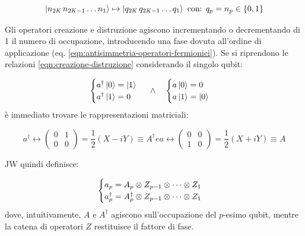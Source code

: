\begin{equation}
    \ket{n_{2\scalebox{0.7}{$K$}}\,n_{2\scalebox{0.7}{$K$}-1}\dots n_1} \mapsto
    \ket{q_{2\scalebox{0.7}{$K$}}\,q_{2\scalebox{0.7}{$K$}-1} \dots q_1}\ \text{con: }
    q_p = n_p \in \{0,1\}
\end{equation}

Gli operatori creazione e distruzione agiscono incrementando o decrementando di 1 il numero di occupazione, introducendo una fase dovuta all'ordine di applicazione (eq. \ref{eqn:antisimmetria-operatori-fermionici}). Se si riprendono le relazioni \ref{eqn:creazione-distruzione} considerando il singolo qubit:

\begin{equation}
\begin{cases}
    a^{\dagger}\ket{0} = \ket{1}\\
    a^{\dagger}\ket{1} = 0
\end{cases}
\ \land\ \ \ 
\begin{cases}
    a\ket{0} = 0\\
    a\ket{1} = \ket{0}
\end{cases}
\end{equation}
\newline
è immediato trovare le rappresentazioni matriciali:

\begin{subequations}
\begin{equation}
    a^{\dagger} \longleftrightarrow 
    \begin{pmatrix}
        0 &1\\
        0 &0
    \end{pmatrix}
    =  \frac12(X-iY) \equiv A^{\dagger}
\end{equation}

e

\begin{equation}
    a \longleftrightarrow 
    \begin{pmatrix}
        0 &0\\
        1 &0
    \end{pmatrix}
    =  \frac12(X+iY) \equiv A
\end{equation}
\end{subequations}

JW quindi definisce:

\begin{equation}\label{eqn:Jordan-Wigner-mapping}
\begin{cases}
    a_{p} = A_{p} \otimes Z_{p-1} \otimes \dots \otimes Z_{1}\\
    a^{\dagger}_{p} = A^{\dagger}_{p} \otimes Z_{p-1} \otimes \dots \otimes Z_{1} \vphantom{\int}
\end{cases}
\end{equation}
\newline
dove, intuitivamente, $A$ e $A^\dagger$ agiscono sull'occupazione del $p$-esimo qubit, mentre la catena di operatori $Z$ restituisce il fattore di fase.

